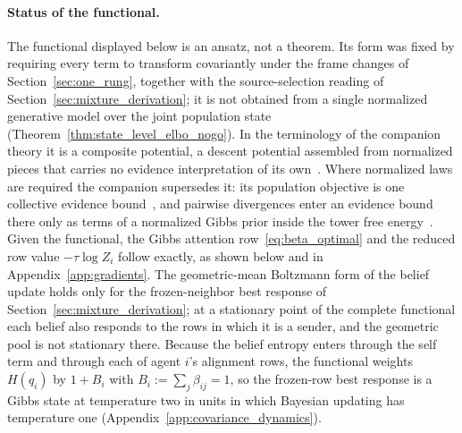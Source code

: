 \documentclass[11pt]{article}
\begin{document}
\paragraph{Status of the functional.} The functional displayed below is an ansatz, not a theorem. Its form was fixed by requiring every term to transform covariantly under the frame changes of Section~\ref{sec:one_rung}, together with the source-selection reading of Section~\ref{sec:mixture_derivation}; it is not obtained from a single normalized generative model over the joint population state (Theorem~\ref{thm:state_level_elbo_nogo}). In the terminology of the companion theory it is a composite potential, a descent potential assembled from normalized pieces that carries no evidence interpretation of its own~\cite[Ch.~12]{DennisGaugeVFE2026}. Where normalized laws are required the companion supersedes it: its population objective is one collective evidence bound~\cite[Ch.~5]{DennisGaugeVFE2026}, and pairwise divergences enter an evidence bound there only as terms of a normalized Gibbs prior inside the tower free energy~\cite[Ch.~12]{DennisGaugeVFE2026}. Given the functional, the Gibbs attention row~\eqref{eq:beta_optimal} and the reduced row value $-\tau \log Z_i$ follow exactly, as shown below and in Appendix~\ref{app:gradients}. The geometric-mean Boltzmann form of the belief update holds only for the frozen-neighbor best response of Section~\ref{sec:mixture_derivation}; at a stationary point of the complete functional each belief also responds to the rows in which it is a sender, and the geometric pool is not stationary there. Because the belief entropy enters through the self term and through each of agent $i$'s alignment rows, the functional weights $H(q_i)$ by $1 + B_i$ with $B_i := \sum_j \beta_{ij} = 1$, so the frozen-row best response is a Gibbs state at temperature two in units in which Bayesian updating has temperature one (Appendix~\ref{app:covariance_dynamics}).
\end{document}
